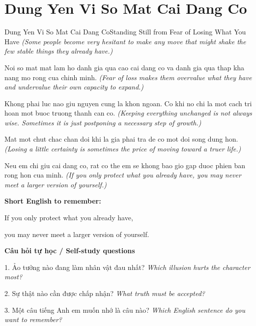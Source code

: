 \section{Dung Yen Vi So Mat Cai Dang Co}
\begin{truyen}{Dung Yen Vi So Mat Cai Dang Co}{Standing Still from Fear of Losing What You Have}
\textit{(Some people become very hesitant to make any move that might shake the few stable things they already have.)}

Noi so mat mat lam ho danh gia qua cao cai dang co va danh gia qua thap kha nang mo rong cua chinh minh.
\textit{(Fear of loss makes them overvalue what they have and undervalue their own capacity to expand.)}

Khong phai luc nao giu nguyen cung la khon ngoan. Co khi no chi la mot cach tri hoan mot buoc truong thanh can co.
\textit{(Keeping everything unchanged is not always wise. Sometimes it is just postponing a necessary step of growth.)}

Mat mot chut chac chan doi khi la gia phai tra de co mot doi song dung hon.
\textit{(Losing a little certainty is sometimes the price of moving toward a truer life.)}

\end{truyen}

\begin{baihoc}
Neu em chi giu cai dang co, rat co the em se khong bao gio gap duoc phien ban rong hon cua minh.
\textit{(If you only protect what you already have, you may never meet a larger version of yourself.)}
\end{baihoc}

\begin{ghinhoanh}
\textbf{Short English to remember:}

If you only protect what you already have,

you may never meet a larger version of yourself.

\end{ghinhoanh}

\begin{tuhocnhanh}
\textbf{Câu hỏi tự học / Self-study questions}

1. Ảo tưởng nào đang làm nhân vật đau nhất? \textit{Which illusion hurts the character most?}

2. Sự thật nào cần được chấp nhận? \textit{What truth must be accepted?}

3. Một câu tiếng Anh em muốn nhớ là câu nào? \textit{Which English sentence do you want to remember?}
\end{tuhocnhanh}
\ngancach

